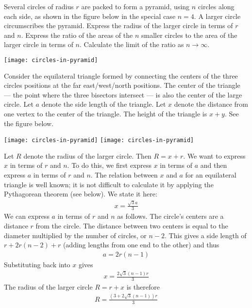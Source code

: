 \documentclass[12pt]{article}
\begin{document}
Several circles of radius $r$ are packed to form a pyramid, using $n$ circles along each side, as shown in the figure below in the special case $n=4$. A larger circle circumscribes the pyramid. Express the radius of the larger circle in terms of $r$ and $n$. Express the ratio of the areas of the $n$ smaller circles to the area of the larger circle in terms of $n$. Calculate the limit of the ratio as $n\rightarrow\infty$. 

\begin{center}
\texttt{[image: circles-in-pyramid]}
\end{center}

\begin{answer}
Consider the equilateral triangle formed by connecting the centers of the three circles positions at the far east/west/north positions. The center of the triangle --- the point where the three bisectors intersect --- is also the center of the large circle. Let $a$ denote the side length of the triangle. Let $x$ denote the distance from one vertex to the center of the triangle. The height of the triangle is $x+y$. See the figure below. 
\begin{center}
\texttt{[image: circles-in-pyramid]}%
\texttt{[image: circles-in-pyramid]}
\end{center}
Let $R$ denote the radius of the larger circle. Then $R=x+r$. We want to express $x$ in terms of $r$ and $n$. To do this, we first express $x$ in terms of $a$ and then express $a$ in terms of $r$ and $n$. The relation between $x$ and $a$ for an equilateral triangle is well known; it is not difficult to calculate it by applying the Pythagorean theorem (see below). We state it here: 
\begin{align*}
x = \frac{\sqrt{3}a}{3}
\end{align*}
We can express $a$ in terms of $r$ and $n$ as follows. The circle's centers are a distance $r$ from the circle. The distance between two centers is equal to the diameter multiplied by the number of circles, or $n-2$. This gives a side length of $r + 2r(n-2) + r$ (adding lengths from one end to the other) and thus
\begin{align*}
a =  2r(n-1)
\end{align*}
Substituting back into $x$ gives
\begin{align*}
x = \frac{2\sqrt{3}(n-1)r}{3}
\end{align*}
The radius of the larger circle $R=r+x$ is therefore 
\begin{align*}
R = \frac{\left(3+2\sqrt{3}(n-1)\right)r}{3}
\end{align*}


\end{answer}
\end{document}
